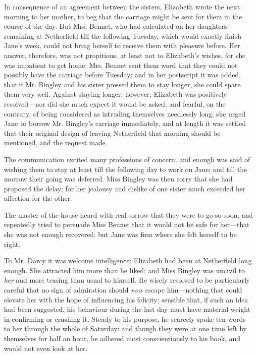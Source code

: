 In consequence of an agreement between the sisters, Elizabeth wrote the next morning to her mother, to beg that the carriage might be sent for them in the course of the day. But Mrs. Bennet, who had calculated on her daughters remaining at Netherfield till the following Tuesday, which would exactly finish Jane's week, could not bring herself to receive them with pleasure before. Her answer, therefore, was not propitious, at least not to Elizabeth's wishes, for she was impatient to get home. Mrs. Bennet sent them word that they could not possibly have the carriage before Tuesday; and in her postscript it was added, that if Mr. Bingley and his sister pressed them to stay longer, she could spare them very well. Against staying longer, however, Elizabeth was positively resolved---nor did she much expect it would be asked; and fearful, on the contrary, of being considered as intruding themselves needlessly long, she urged Jane to borrow Mr. Bingley's carriage immediately, and at length it was settled that their original design of leaving Netherfield that morning should be mentioned, and the request made.

The communication excited many professions of concern; and enough was said of wishing them to stay at least till the following day to work on Jane; and till the morrow their going was deferred. Miss Bingley was then sorry that she had proposed the delay; for her jealousy and dislike of one sister much exceeded her affection for the other.

The master of the house heard with real sorrow that they were to go so soon, and repeatedly tried to persuade Miss Bennet that it would not be safe for her---that she was not enough recovered; but Jane was firm where she felt herself to be right.

To Mr. Darcy it was welcome intelligence: Elizabeth had been at Netherfield long enough. She attracted him more than he liked; and Miss Bingley was uncivil to \textit{her} and more teasing than usual to himself. He wisely resolved to be particularly careful that no sign of admiration should \textit{now} escape him---nothing that could elevate her with the hope of influencing his felicity; sensible that, if such an idea had been suggested, his behaviour during the last day must have material weight in confirming or crushing it. Steady to his purpose, he scarcely spoke ten words to her through the whole of Saturday: and though they were at one time left by themselves for half an hour, he adhered most conscientiously to his book, and would not even look at her.

